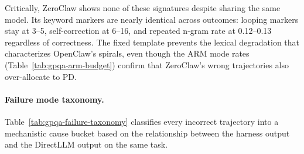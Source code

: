Critically, ZeroClaw shows none of these signatures despite sharing the same
model.
Its keyword markers are nearly identical across outcomes: looping markers stay
at 3--5, self-correction at 6--16, and repeated n-gram rate at 0.12--0.13
regardless of correctness.
The fixed template prevents the lexical degradation that characterizes
OpenClaw's spirals, even though the ARM mode rates (Table~\ref{tab:gpqa-arm-budget})
confirm that ZeroClaw's wrong trajectories also over-allocate to PD.

\paragraph{Failure mode taxonomy.}

Table~\ref{tab:gpqa-failure-taxonomy} classifies every incorrect trajectory
into a mechanistic cause bucket based on the relationship between the harness
output and the DirectLLM output on the same task.

